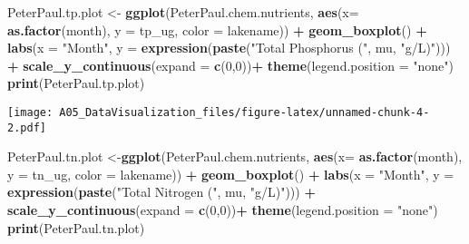 \documentclass[]{article}
\newenvironment{Shaded}{\begin{snugshade}}{\end{snugshade}}
\newcommand{\DataTypeTok}[1]{\textcolor[rgb]{0.13,0.29,0.53}{#1}}
\newcommand{\DecValTok}[1]{\textcolor[rgb]{0.00,0.00,0.81}{#1}}
\newcommand{\KeywordTok}[1]{\textcolor[rgb]{0.13,0.29,0.53}{\textbf{#1}}}
\newcommand{\NormalTok}[1]{#1}
\newcommand{\OperatorTok}[1]{\textcolor[rgb]{0.81,0.36,0.00}{\textbf{#1}}}
\newcommand{\StringTok}[1]{\textcolor[rgb]{0.31,0.60,0.02}{#1}}
\begin{document}
\begin{Shaded}
\begin{Highlighting}[]
\NormalTok{PeterPaul.tp.plot <-}
\StringTok{  }\KeywordTok{ggplot}\NormalTok{(PeterPaul.chem.nutrients, }\KeywordTok{aes}\NormalTok{(}\DataTypeTok{x=} \KeywordTok{as.factor}\NormalTok{(month), }\DataTypeTok{y =}\NormalTok{ tp_ug, }\DataTypeTok{color =}\NormalTok{ lakename)) }\OperatorTok{+}
\StringTok{  }\KeywordTok{geom_boxplot}\NormalTok{() }\OperatorTok{+}
\StringTok{  }\KeywordTok{labs}\NormalTok{(}\DataTypeTok{x =} \StringTok{"Month"}\NormalTok{, }\DataTypeTok{y =} \KeywordTok{expression}\NormalTok{(}\KeywordTok{paste}\NormalTok{(}\StringTok{"Total Phosphorus ("}\NormalTok{, mu, }\StringTok{"g/L)"}\NormalTok{))) }\OperatorTok{+}
\StringTok{  }\KeywordTok{scale_y_continuous}\NormalTok{(}\DataTypeTok{expand =} \KeywordTok{c}\NormalTok{(}\DecValTok{0}\NormalTok{,}\DecValTok{0}\NormalTok{))}\OperatorTok{+}
\StringTok{  }\KeywordTok{theme}\NormalTok{(}\DataTypeTok{legend.position =} \StringTok{"none"}\NormalTok{)}
\KeywordTok{print}\NormalTok{(PeterPaul.tp.plot)}
\end{Highlighting}
\end{Shaded}

\texttt{[image: A05\_DataVisualization\_files/figure-latex/unnamed-chunk-4-2.pdf]}

\begin{Shaded}
\begin{Highlighting}[]
\NormalTok{PeterPaul.tn.plot <-}\KeywordTok{ggplot}\NormalTok{(PeterPaul.chem.nutrients, }\KeywordTok{aes}\NormalTok{(}\DataTypeTok{x=} \KeywordTok{as.factor}\NormalTok{(month), }\DataTypeTok{y =}\NormalTok{ tn_ug, }\DataTypeTok{color =}\NormalTok{ lakename)) }\OperatorTok{+}
\StringTok{  }\KeywordTok{geom_boxplot}\NormalTok{() }\OperatorTok{+}
\StringTok{  }\KeywordTok{labs}\NormalTok{(}\DataTypeTok{x =} \StringTok{"Month"}\NormalTok{, }\DataTypeTok{y =} \KeywordTok{expression}\NormalTok{(}\KeywordTok{paste}\NormalTok{(}\StringTok{"Total Nitrogen ("}\NormalTok{, mu, }\StringTok{"g/L)"}\NormalTok{))) }\OperatorTok{+}
\StringTok{  }\KeywordTok{scale_y_continuous}\NormalTok{(}\DataTypeTok{expand =} \KeywordTok{c}\NormalTok{(}\DecValTok{0}\NormalTok{,}\DecValTok{0}\NormalTok{))}\OperatorTok{+}
\StringTok{  }\KeywordTok{theme}\NormalTok{(}\DataTypeTok{legend.position =} \StringTok{"none"}\NormalTok{)}
\KeywordTok{print}\NormalTok{(PeterPaul.tn.plot)}
\end{Highlighting}
\end{Shaded}
\end{document}
